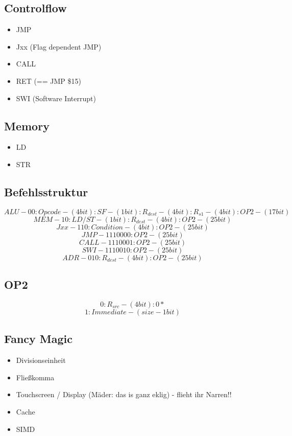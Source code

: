 \documentclass[a4paper]{article}
\begin{document}
\begin{multicols}{2}
\subsection{Controlflow}

\begin{itemize}
\item JMP
\item Jxx (Flag dependent JMP)
\item CALL
\item RET (== JMP \$15)
\item SWI (Software Interrupt)
\end{itemize}

\subsection{Memory}

\begin{itemize}
\item LD
\item STR
\end{itemize}
\end{multicols}


\subsection{Befehlsstruktur}
\[ALU - 00 : Opcode - (4bit) : SF - (1bit) : R_{dest} - (4bit) : R_{s1} - (4bit) : OP2 - (17bit)\]
\[MEM - 10 : LD/ST - (1bit) : R_{dest} - (4bit) : OP2 - (25bit)\]
\[Jxx - 110 : Condition - (4bit) : OP2 - (25bit)\]
\[JMP - 1110000 : OP2 - (25bit)\]
\[CALL- 1110001 : OP2 - (25bit)\]
\[SWI - 1110010 : OP2 - (25bit)\]
\[ADR - 010 : R_{dest} - (4bit) : OP2 - (25bit)\]

\subsection{OP2}
\[ 0 : R_{src} - (4bit) : 0* \]
\[ 1 : Immediate - (size -1 bit) \]

\subsection{Fancy Magic}

\begin{itemize}
\item Divisionseinheit
\item Fließkomma
\item Touchscreen / Display (Mäder: das is ganz eklig) - flieht ihr Narren!!
\item Cache
\item SIMD
\end{itemize}
\end{document}

